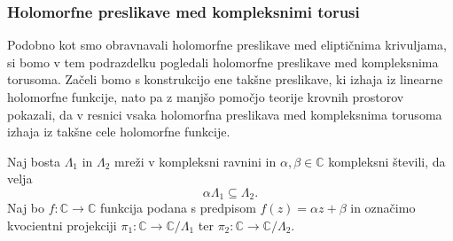 \documentclass[mat1]{fmfdelo}
\numberwithin{equation}{section}
\newcommand{\C}{\mathbb C}
\theoremstyle{definition}
\begin{document}
\subsubsection{Holomorfne preslikave med kompleksnimi torusi}

Podobno kot smo obravnavali holomorfne preslikave med eliptičnima krivuljama, si bomo v tem podrazdelku pogledali holomorfne preslikave med kompleksnima torusoma. Začeli bomo s konstrukcijo ene takšne preslikave, ki izhaja iz linearne holomorfne funkcije, nato pa z manjšo pomočjo teorije krovnih prostorov pokazali, da v resnici vsaka holomorfna preslikava med kompleksnima torusoma izhaja iz takšne cele holomorfne funkcije. 

\begin{zgled*}
    \label{afina transformacija C inducira holomorfno preslikavo torusov}
    Naj bosta $\Lambda_1$ in $\Lambda_2$ mreži v kompleksni ravnini in $\alpha,\beta \in \C$ kompleksni števili, da velja
    \[
        \alpha\Lambda_1 \subseteq \Lambda_2.
    \]
    Naj bo $f : \C \to \C$ funkcija podana s predpisom $f(z) = \alpha z + \beta$ in označimo kvocientni projekciji $\pi_1 : \C \to \C/\Lambda_1$ ter $\pi_2 : \C \to \C/\Lambda_2$. 


\end{zgled*}
\end{document}
